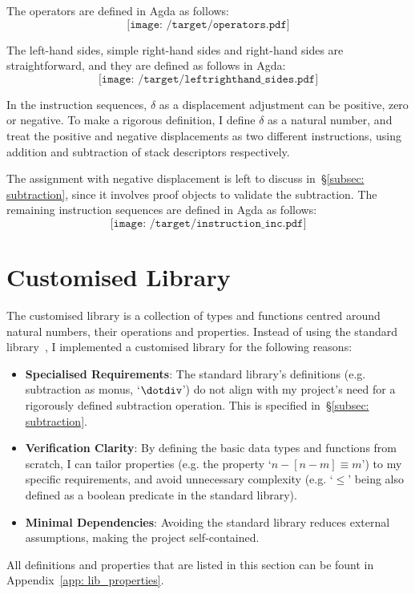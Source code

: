 \documentclass[12pt,a4paper]{report}
\theoremstyle{definition}
\newcommand{\secref}[1]{\S\ref{#1}}
\begin{document}
    The operators are defined in Agda as follows:
    \[\texttt{[image: /target/operators.pdf]}\]

    The left-hand sides, simple right-hand sides and right-hand sides are straightforward, and they are defined as follows in Agda:
    \[\texttt{[image: /target/leftrighthand\_sides.pdf]}\]

    In the instruction sequences, $\delta$ as a displacement adjustment can be positive, zero or negative. To make a rigorous definition, I define $\delta$ as a natural number, and treat the positive and negative displacements as two different instructions, using addition and subtraction of stack descriptors respectively. 

    The assignment with negative displacement is left to discuss in~\secref{subsec: subtraction}, since it involves proof objects to validate the subtraction. 
    The remaining instruction sequences are defined in Agda as follows:
    \[\texttt{[image: /target/instruction\_inc.pdf]}\]


    \section{Customised Library} \label{sec: lib}
    The customised library is a collection of types and functions centred around natural numbers, their operations and properties. Instead of using the standard library~\autocite{agda_std}, I implemented a customised library for the following reasons:
    \begin{itemize}
        \item
            \textbf{Specialised Requirements}: The standard library's definitions (e.g. subtraction as monus, `$\dotdiv$') do not align with my project's need for a rigorously defined subtraction operation. This is specified in~\secref{subsec: subtraction}.
        \item
            \textbf{Verification Clarity}: By defining the basic data types and functions from scratch, I can tailor properties (e.g. the property `$n-[n-m] \equiv m$') to my specific requirements, and avoid unnecessary complexity (e.g. `$\leq$' being also defined as a boolean predicate in the standard library). 
        \item
            \textbf{Minimal Dependencies}: Avoiding the standard library reduces external assumptions, making the project self-contained. 
    \end{itemize}
    All definitions and properties that are listed in this section can be fount in Appendix~\ref{app: lib_properties}.
\end{document}

